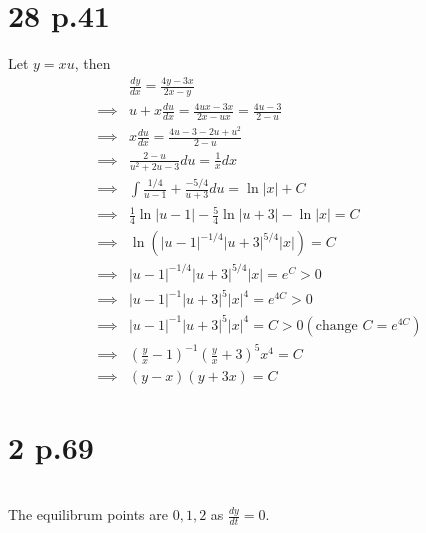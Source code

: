 \documentclass[11pt]{article}
\begin{document}
\section*{28 p.41}
Let $y = xu$, then 
\begin{equation*}
    \begin{aligned}
        &\frac{dy}{dx} = \frac{4y-3x}{2x-y}  \\
        \implies &u+ x\frac{du}{dx} = \frac{4ux - 3x}{2x-ux} = \frac{4u-3}{2-u} \\
        \implies &x\frac{du}{dx} = \frac{4u-3-2u+u^2}{2-u} \\
        \implies &\frac{2-u}{u^2+2u-3} du= \frac{1}{x} dx \\
        \implies &\int \frac{1/4}{u-1} + \frac{-5/4}{u+3}du = \ln|x| + C \\
        \implies &\frac{1}{4} \ln|u-1| - \frac{5}{4} \ln|u+3| - \ln|x| = C \\
        \implies &\ln \left(|u-1|^{-1/4} |u+3|^{5/4} |x|\right) = C \\
        \implies &|u-1|^{-1/4} |u+3|^{5/4} |x| = e^C > 0 \\
        \implies &|u-1|^{-1} |u+3|^{5} |x|^4 = e^{4C} > 0 \\
        \implies &|u-1|^{-1} |u+3|^{5} |x|^4 = C > 0 (\text{change } C = e^{4C}) \\
        \implies &\left(\frac{y}{x} - 1\right)^{-1} \left( \frac{y}{x} +3 \right)^5 x^4 = C \\
        \implies &(y-x)(y+3x) = C
    \end{aligned}
\end{equation*}
\newpage
\section*{2 p.69}
 \\
The equilibrum points are $0,1,2$ as $\frac{dy}{dt} = 0$.
\end{document}
